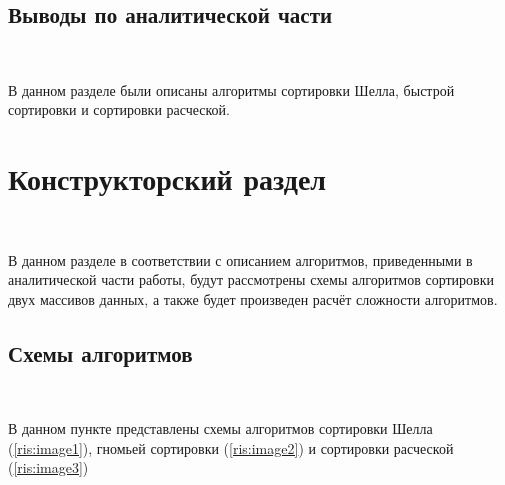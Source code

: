 \documentclass[12pt]{report}
\begin{document}
	\section{Выводы по аналитической части}
	
	~\
	
	В данном разделе были описаны алгоритмы сортировки Шелла, быстрой сортировки и сортировки расческой.
	
	\chapter{Конструкторский раздел}
	
	~\
	
	В данном разделе в соответствии с описанием алгоритмов, приведенными в аналитической части работы, будут рассмотрены схемы алгоритмов
	сортировки двух массивов данных, а также будет произведен расчёт сложности алгоритмов.
	
	\section{Схемы алгоритмов}
	
	~\
	
	В данном пункте представлены схемы алгоритмов сортировки Шелла (\ref{ris:image1}), гномьей сортировки (\ref{ris:image2}) и сортировки расческой (\ref{ris:image3})
	
\end{document}
